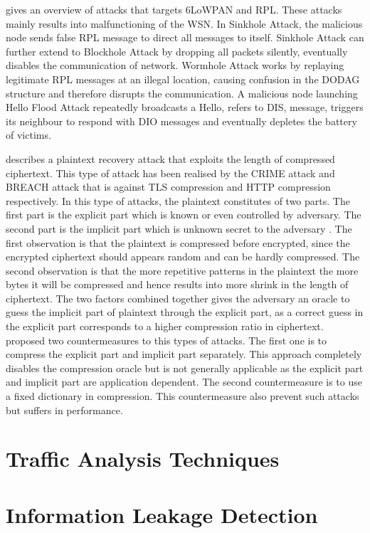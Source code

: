 \cite{6lpRplAtk} gives an overview of attacks that targets 6LoWPAN and RPL. These attacks mainly results into malfunctioning of the WSN. In Sinkhole Attack\cite{Sinkhole}, the malicious node sends false RPL message to direct all messages to itself. Sinkhole Attack can further extend to Blockhole Attack\cite{Blackhole} by dropping all packets silently, eventually disables the communication of network. Wormhole Attack\cite{Wormhole} works by replaying legitimate RPL messages at an illegal location, causing confusion in the DODAG structure and therefore disrupts the communication. A malicious node launching Hello Flood Attack repeatedly broadcasts a Hello, refers to DIS, message, triggers its neighbour to respond with DIO messages and eventually depletes the battery of victims.

\cite{CompressionRationAttack} describes a plaintext recovery attack that exploits the length of compressed ciphertext. This type of attack has been realised by the CRIME\cite{CRIME} attack and BREACH\cite{BREACH} attack that is against TLS compression and HTTP compression respectively. In this type of attacks, the plaintext constitutes of two parts. The first part is the explicit part which is known or even controlled by adversary. The second part is the implicit part which is unknown secret to the adversary . The first observation is that the plaintext is compressed before encrypted, since the encrypted ciphertext should appears random and can be hardly compressed. The second observation is that the more repetitive patterns in the plaintext the more bytes it will be compressed and hence results into more shrink in the length of ciphertext. The two factors combined together gives the adversary an oracle to guess the implicit part of plaintext through the explicit part, as a correct guess in the explicit part corresponds to a higher compression ratio in ciphertext.\cite{CompressionCountermeasure} proposed two countermeasures to this types of attacks. The first one is to compress the explicit part and implicit part separately. This approach completely disables the compression oracle but is not generally applicable as the explicit part and implicit part are application dependent. The second countermeasure is to use a fixed dictionary in compression. This countermeasure also prevent such attacks but suffers in performance.



\section{Traffic Analysis Techniques}

\section{Information Leakage Detection}

